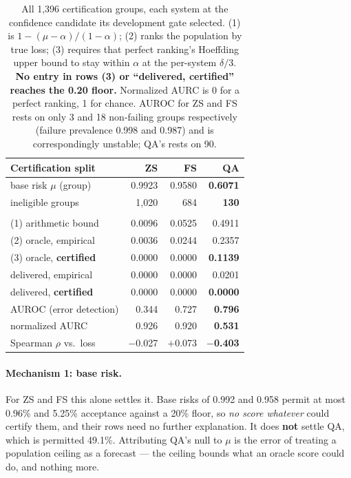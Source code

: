 \documentclass[11pt]{article}
\begin{document}
\begin{table}[t]
\centering
\small
\setlength{\tabcolsep}{4pt}
\begin{tabular}{@{}lrrr@{}}
\toprule
Certification split & ZS & FS & \textbf{QA} \\
\midrule
base risk $\mu$ (group)            & 0.9923 & 0.9580 & \textbf{0.6071} \\
ineligible groups                  & 1,020  & 684    & \textbf{130} \\
\addlinespace
\multicolumn{4}{@{}l}{\emph{upper bounds on acceptance at $\alpha=0.20$}}\\
(1) arithmetic bound               & 0.0096 & 0.0525 & 0.4911 \\
(2) oracle, empirical              & 0.0036 & 0.0244 & 0.2357 \\
(3) oracle, \textbf{certified}     & 0.0000 & 0.0000 & \textbf{0.1139} \\
\addlinespace
delivered, empirical               & 0.0000 & 0.0000 & 0.0201 \\
delivered, \textbf{certified}      & 0.0000 & 0.0000 & \textbf{0.0000} \\
\addlinespace
AUROC (error detection)            & 0.344  & 0.727  & \textbf{0.796} \\
normalized AURC                    & 0.926  & 0.920  & \textbf{0.531} \\
Spearman $\rho$ vs.\ loss          & $-$0.027 & $+$0.073 & \textbf{$-$0.403} \\
\bottomrule
\end{tabular}
\caption{All 1,396 certification groups, each system at the confidence candidate its development
gate selected. (1) is $1-(\mu-\alpha)/(1-\alpha)$; (2) ranks the population by true loss; (3)
requires that perfect ranking's Hoeffding upper bound to stay within $\alpha$ at the per-system
$\delta/3$. \textbf{No entry in rows (3) or ``delivered, certified'' reaches the 0.20 floor.}
Normalized AURC is 0 for a perfect ranking, 1 for chance. AUROC for ZS and FS rests on only 3 and
18 non-failing groups respectively (failure prevalence 0.998 and 0.987) and is correspondingly
unstable; QA's rests on 90.}
\label{tab:main}
\end{table}

\paragraph{Mechanism 1: base risk.} For ZS and FS this alone settles it. Base risks of 0.992 and
0.958 permit at most 0.96\% and 5.25\% acceptance against a 20\% floor, so \emph{no score whatever}
could certify them, and their rows need no further explanation. It does \textbf{not} settle QA,
which is permitted 49.1\%. Attributing QA's null to $\mu$ is the error of treating a population
ceiling as a forecast --- the ceiling bounds what an oracle score could do, and nothing more.
\end{document}
